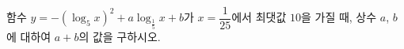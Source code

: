 함수 $y=-(\log_5 x)^2+a\log_{\frac{1}{5}} x+b$가 $x=\dfrac{1}{25}$에서 최댓값 $10$을 가질 때, 상수 $a$, $b$에 대하여 $a+b$의 값을 구하시오.
